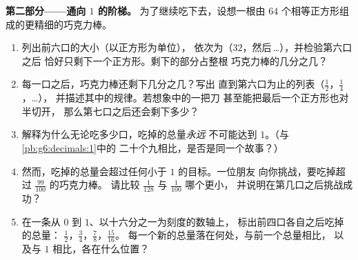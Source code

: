 \begin{problem}
\medskip
\noindent\textbf{第二部分——通向 $1$ 的阶梯。}
为了继续吃下去，设想一根由 $64$ 个相等正方形组成的更精细的巧克力棒。
\begin{enumerate}[resume]
  \item 列出前六口的大小（以正方形为单位），
        依次为（$32$，然后\,\dots），并检验第六口之后
        恰好只剩下一个正方形。剩下的部分占整根
        巧克力棒的几分之几？
  \item 每一口之后，巧克力棒还剩下几分之几？写出
        直到第六口为止的列表（$\frac12$，$\frac14$，\dots），
        并描述其中的规律。若想象中的一把刀
        甚至能把最后一个正方形也对半切开，
        那么第七口之后还会剩下多少？
  \item 解释为什么无论吃多少口，吃掉的总量\emph{永远}
        不可能达到 $1$。（与\cref{pb:g6:decimals:1}中的
        二十个九相比，是否是同一个故事？）
  \item 然而，吃掉的总量会超过任何小于 $1$ 的目标。一位朋友
        向你挑战，要吃掉超过 $\frac{99}{100}$ 的巧克力棒。
        请比较 $\frac{1}{128}$ 与
        $\frac{1}{100}$ 哪个更小，
        并说明在第几口之后挑战成功？
  \item 在一条从 $0$ 到 $1$、以十六分之一为刻度的数轴上，
        标出前四口各自之后吃掉的总量：
        $\frac12$，$\frac34$，$\frac78$，$\frac{15}{16}$。
        每一个新的总量落在何处，与前一个总量相比，
        以及与 $1$ 相比，各在什么位置？
\end{enumerate}


\end{problem}
